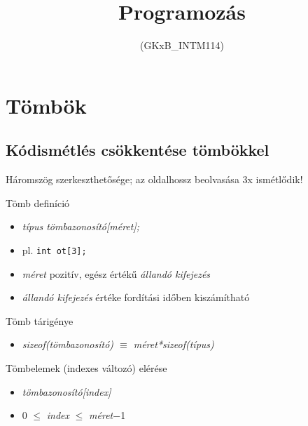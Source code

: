 \documentclass[usenames,dvipsnames,aspectratio=169]{beamer}
\title[3. előadás]{Programozás}
\subtitle{(GKxB\_INTM114)}
\begin{document}
\begin{frame}[plain]
  \titlepage
  \logoalul
\end{frame}

\section{Tömbök}
\subsection{Kódismétlés csökkentése tömbökkel}
\begin{frame}
  \begin{exampleblock}{ Háromszög szerkeszthetősége; az oldalhossz beolvasása 3x ismétlődik!}
    \tiny
    \vspace{-.2cm}
    
    \vspace{-.2cm}
  \end{exampleblock}
\end{frame}

\begin{frame}
  \begin{exampleblock}{}
    \tiny
    \vspace{-.2cm}
    
    \vspace{-.2cm}
  \end{exampleblock}
\end{frame}

\begin{frame}
  Tömb definíció
  \begin{itemize}
    \item \emph{típus tömbazonosító[méret];}
    \item pl. \texttt{int ot[3];}
    \item \emph{méret} pozitív, egész értékű \emph{állandó kifejezés}
    \item \emph{állandó kifejezés} értéke fordítási időben kiszámítható
  \end{itemize}
  Tömb tárigénye
  \begin{itemize}
    \item[] \emph{sizeof(tömbazonosító) $\equiv$ méret*sizeof(típus)}
  \end{itemize}
  Tömbelemek (indexes változó) elérése
  \begin{itemize}
    \item \emph{tömbazonosító[index]}
    \item 0 $\leq$ \emph{index} $\leq$ \emph{méret}$-$1
  \end{itemize}
\end{frame}
\end{document}
